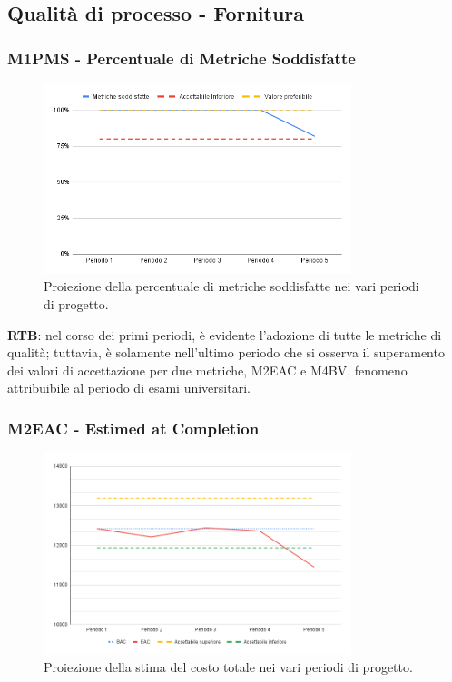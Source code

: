 \subsection{Qualità di processo - Fornitura}

\subsubsection{M1PMS - Percentuale di Metriche Soddisfatte}
\begin{figure}[H]
    \centering
    \includegraphics[width=0.8\textwidth]{../Images/PianoDiQualifica/M1PMS.png}
    \caption{Proiezione della percentuale di metriche soddisfatte nei vari periodi di progetto.}
    \label{fig:1}
\end{figure}
\textbf{RTB}: nel corso dei primi periodi, è evidente l'adozione di tutte le metriche di qualità; tuttavia, è solamente nell'ultimo periodo che si osserva il superamento dei valori di accettazione per due metriche, M2EAC e M4BV, fenomeno attribuibile al periodo di esami universitari.

\subsubsection{M2EAC - Estimed at Completion}

\begin{figure}[H]
    \centering
    \includegraphics[width=0.8\textwidth]{../Images/PianoDiQualifica/M2EAC.png}
    \caption{Proiezione della stima del costo totale nei vari periodi di progetto.}
    \label{fig:2}
\end{figure}

